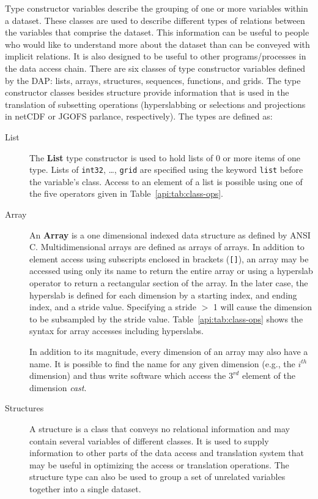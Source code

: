 Type constructor variables describe the grouping of one or more variables
within a dataset. These classes are used to describe different types of
relations between the variables that comprise the dataset. This information
can be useful to people who would like to understand more about the dataset
than can be conveyed with implicit relations. It is also designed to be
useful to other programs/processes in the data access chain.  There are six
classes of type constructor variables defined by the DAP: lists, arrays,
structures, sequences, functions, and grids. The type constructor classes
besides structure provide information that is used in the translation of
subsetting operations (hyperslabbing or selections and projections in netCDF
or JGOFS parlance, respectively). The types are defined as:

\begin{description}

\item [List] The {\bf List} type constructor is used to hold lists of 0 or
  more items of one type. Lists of {\tt int32}, \ldots, {\tt grid} are
  specified using the keyword {\tt list} before the variable's class. Access
  to an element of a list is possible using one of the five operators given
  in Table~\ref{api:tab:class-ops}.

\item [Array] An {\bf Array} is a one dimensional indexed data
  structure as defined by ANSI C\@. Multidimensional arrays are
  defined as arrays of arrays. In addition to element access using
  subscripts enclosed in brackets ({\tt []}), an array may be accessed
  using only its name to return the entire array or using a hyperslab
  operator to return a rectangular section of the array. In the later
  case, the hyperslab is defined for each dimension by a starting
  index, and ending index, and a stride value.  Specifying a stride
  $>$ 1 will cause the dimension to be subsampled by the stride value.
  Table~\ref{api:tab:class-ops} shows the syntax for array accesses
  including hyperslabs.

  In addition to its magnitude, every dimension of an array may also
  have a name. It is possible to find the name for any given dimension
  (e.g., the $i^{th}$ dimension) and thus write software which access
  the $3^{rd}$ element of the dimension {\em cast\/}.

\item [Structures] A structure is a class that conveys no relational
  information and may contain several variables of different classes. It is
  used to supply information to other parts of the data access and
  translation system that may be useful in optimizing the access or
  translation operations. The structure type can also be used to group a set
  of unrelated variables together into a single dataset.


\end{description}
